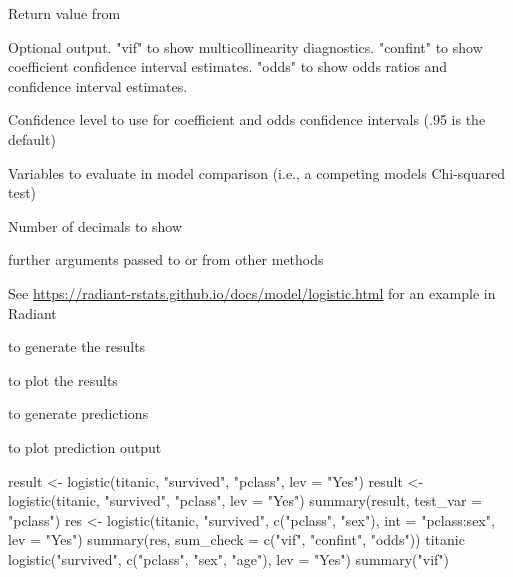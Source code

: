 \documentclass[a4paper]{book}
\begin{document}
\begin{Arguments}
\begin{ldescription}
\item[\code{object}] Return value from 

\item[\code{sum\_check}] Optional output. "vif" to show multicollinearity diagnostics. "confint" to show coefficient confidence interval estimates. "odds" to show odds ratios and confidence interval estimates.

\item[\code{conf\_lev}] Confidence level to use for coefficient and odds confidence intervals (.95 is the default)

\item[\code{test\_var}] Variables to evaluate in model comparison (i.e., a competing models Chi-squared test)

\item[\code{dec}] Number of decimals to show

\item[\code{...}] further arguments passed to or from other methods
\end{ldescription}
\end{Arguments}
%
\begin{Details}
See \url{https://radiant-rstats.github.io/docs/model/logistic.html} for an example in Radiant
\end{Details}
%
\begin{SeeAlso}
 to generate the results

 to plot the results

 to generate predictions

 to plot prediction output
\end{SeeAlso}
%
\begin{Examples}
\begin{ExampleCode}

result <- logistic(titanic, "survived", "pclass", lev = "Yes")
result <- logistic(titanic, "survived", "pclass", lev = "Yes")
summary(result, test_var = "pclass")
res <- logistic(titanic, "survived", c("pclass", "sex"), int = "pclass:sex", lev = "Yes")
summary(res, sum_check = c("vif", "confint", "odds"))
titanic %
  logistic("survived", c("pclass", "sex", "age"), lev = "Yes") %
  summary("vif")
\end{ExampleCode}
\end{Examples}
\end{document}
